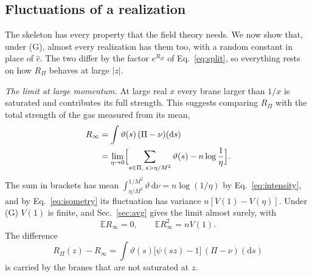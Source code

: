 \documentclass[aps,prd,10pt,twocolumn,superscriptaddress,nofootinbib,floatfix,longbibliography]{revtex4-2}
\newcommand{\bE}{\mathbb{E}}
\newcommand{\dd}{\mathrm{d}}
\begin{document}
\subsection{Fluctuations of a realization}
\label{sec:fluct}

The skeleton has every property that the field theory needs. We now show that, under (G), almost every realization has them too, with a random constant in place of $\hat c$. The two differ by the factor $e^{R_\Pi}$ of Eq.~\eqref{eq:split}, so everything rests on how $R_\Pi$ behaves at large $|z|$.

\textit{The limit at large momentum.} At large real $x$ every brane larger than $1/x$ is saturated and contributes its full strength. This suggests comparing $R_\Pi$ with the total strength of the gas measured from its mean,
\begin{equation}
\label{eq:Rinf}
\begin{aligned}
R_\infty&=\int\vartheta(s)\,(\Pi-\nu)(\dd s)\\
&=\lim_{\eta\to0}\Bigl[\sum_{s\in\Pi,\;s>\eta/M^2}\vartheta(s)-n\log\frac1\eta\Bigr].
\end{aligned}
\end{equation}
The sum in brackets has mean $\int_{\eta/M^2}^{1/M^2}\vartheta\,\dd\nu=n\log(1/\eta)$ by Eq.~\eqref{eq:intensity}, and by Eq.~\eqref{eq:isometry} its fluctuation has variance $n[V(1)-V(\eta)]$. Under (G) $V(1)$ is finite, and Sec.~\ref{sec:avg} gives the limit almost surely, with
\begin{equation}
\label{eq:Rinfstats}
\bE R_\infty=0,\qquad\bE R_\infty^2=nV(1).
\end{equation}
The difference
\begin{equation}
\label{eq:fdef}
R_\Pi(z)-R_\infty=\int\vartheta(s)\bigl[\psi(sz)-1\bigr]\,(\Pi-\nu)(\dd s)
\end{equation}
is carried by the branes that are not saturated at $z$.
\end{document}
